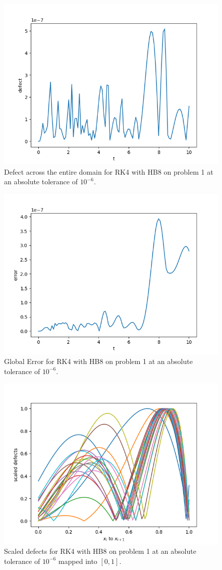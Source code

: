 \begin{figure}[H]
\centering
\includegraphics[width=0.7\linewidth]{./figures/rk4_with_hb8_p1_global_defect}
\caption{Defect across the entire domain for RK4 with HB8 on problem 1 at an absolute tolerance of $10^{-6}$.}
\label{fig:rk4_with_hb8_p1_global_defect}
\end{figure}

\begin{figure}[H]
\centering
\includegraphics[width=0.7\linewidth]{./figures/rk4_with_hb8_p1_global_error}
\caption{Global Error for RK4 with HB8 on problem 1 at an absolute tolerance of $10^{-6}$.}
\label{fig:rk4_with_hb8_p1_global_error}
\end{figure}

\begin{figure}[H]
\centering
\includegraphics[width=0.7\linewidth]{./figures/rk4_with_hb8_p1_scaled_defects}
\caption{Scaled defects for RK4 with HB8 on problem 1 at an absolute tolerance of $10^{-6}$ mapped into $[0, 1]$.}
\label{fig:rk4_with_hb8_p1_scaled_defects}
\end{figure}

